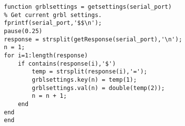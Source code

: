 \begin{lstlisting}
function grblsettings = getsettings(serial_port)
% Get current grbl settings.
fprintf(serial_port,'$$\n');
pause(0.25)
response = strsplit(getResponse(serial_port),'\n');
n = 1;
for i=1:length(response)
    if contains(response(i),'$')
        temp = strsplit(response(i),'=');
        grblsettings.key(n) = temp(1);
        grblsettings.val(n) = double(temp(2));
        n = n + 1;
    end
end
end

\end{lstlisting}